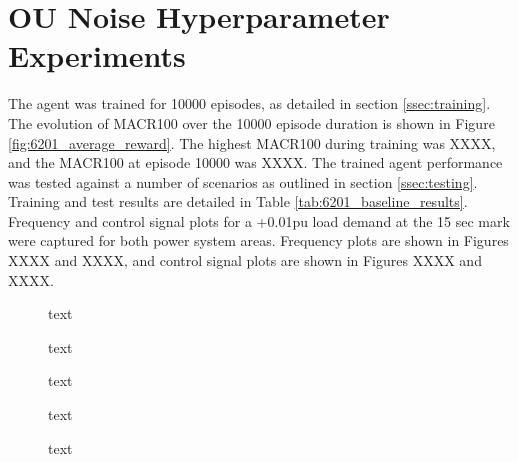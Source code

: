 \section{OU Noise Hyperparameter Experiments}
The agent was trained for 10000 episodes, as detailed in section \ref{ssec:training}. The evolution of MACR100 over the 10000 episode duration is shown in Figure \ref{fig:6201_average_reward}. The highest MACR100 during training was XXXX, and the MACR100 at episode 10000 was XXXX. The trained agent performance was tested against a number of scenarios as outlined in section \ref{ssec:testing}. Training and test results are detailed in Table \ref{tab:6201_baseline_results}. Frequency and control signal plots for a +0.01pu load demand at the 15 sec mark were captured for both power system areas. Frequency plots are shown in Figures XXXX and XXXX, and control signal plots are shown in Figures XXXX and XXXX.

\vspace{2cm}

\begin{figure}[h]
	\centering
	
	\caption{text}
\end{figure}





\begin{figure}[h]
	\centering
	
	
	\caption{text}
	
	
	\caption{text}
	
	
	\caption{text}
				
	
	\caption{text}
\end{figure}